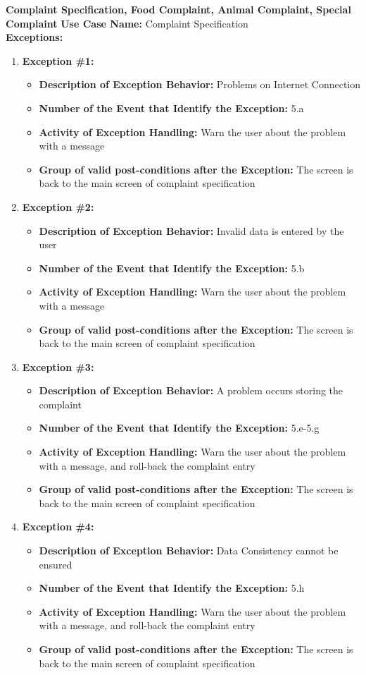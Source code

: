 \documentclass[11pt,twoside]{article}
\begin{document}
\textbf{Complaint Specification, Food Complaint, Animal Complaint, Special Complaint}
\textbf{Use Case Name:} Complaint Specification\\
\textbf{Exceptions:}
\begin{enumerate}
 \item \textbf{Exception \#1:}
 \begin{itemize}
  \item \textbf{Description of Exception Behavior:} Problems on Internet Connection
  \item \textbf{Number of the Event that Identify the Exception:} 5.a
  \item \textbf{Activity of Exception Handling:} Warn the user about the problem with a message
  \item \textbf{Group of valid post-conditions after the Exception:} The screen is back to the main screen of complaint specification
 \end{itemize}
 \item \textbf{Exception \#2:}
 \begin{itemize}
  \item \textbf{Description of Exception Behavior:} Invalid data is entered by the user
  \item \textbf{Number of the Event that Identify the Exception:} 5.b
  \item \textbf{Activity of Exception Handling:} Warn the user about the problem with a message
  \item \textbf{Group of valid post-conditions after the Exception:} The screen is back to the main screen of complaint specification
 \end{itemize}
 \item \textbf{Exception \#3:}
 \begin{itemize}
  \item \textbf{Description of Exception Behavior:} A problem occurs storing the complaint
  \item \textbf{Number of the Event that Identify the Exception:} 5.e-5.g
  \item \textbf{Activity of Exception Handling:} Warn the user about the problem with a message, and roll-back the complaint entry
  \item \textbf{Group of valid post-conditions after the Exception:} The screen is back to the main screen of complaint specification
 \end{itemize}
 \item \textbf{Exception \#4:}
 \begin{itemize}
  \item \textbf{Description of Exception Behavior:} Data Consistency cannot be ensured
  \item \textbf{Number of the Event that Identify the Exception:} 5.h
  \item \textbf{Activity of Exception Handling:} Warn the user about the problem with a message, and roll-back the complaint entry
  \item \textbf{Group of valid post-conditions after the Exception:} The screen is back to the main screen of complaint specification
 \end{itemize}
\end{enumerate}
\end{document}
